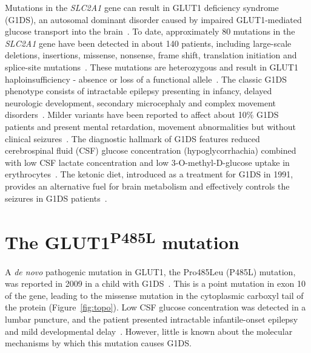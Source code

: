 Mutations in the \textit{SLC2A1} gene can result in GLUT1 deficiency syndrome (G1DS), an autosomal dominant disorder caused by impaired GLUT1-mediated glucose transport into the brain~\cite{De,Klepper}. To date, approximately 80 mutations in the \textit{SLC2A1} gene have been detected in about 140 patients, including large-scale deletions, insertions, missense, nonsense, frame shift, translation initiation and splice-site mutations~\cite{Wang, Leen}. These mutations are heterozygous and result in GLUT1 haploinsufficiency - absence or loss of a functional allele~\cite{Klepper,Leen}. The classic G1DS phenotype consists of intractable epilepsy presenting in infancy, delayed neurologic development, secondary microcephaly and complex movement disorders~\cite{De,Klepper}. Milder variants have been reported to affect about 10\% G1DS patients and present mental retardation, movement abnormalities but without clinical seizures~\cite{Wang,Suls}. The diagnostic hallmark of G1DS features reduced cerebrospinal fluid (CSF) glucose concentration (hypoglycorrhachia) combined with low CSF lactate concentration and low 3-O-methyl-D-glucose uptake in erythrocytes~\cite{Wang,Klepper.2}. The ketonic diet, introduced as a treatment for G1DS in 1991, provides an alternative fuel for brain metabolism and effectively controls the seizures in G1DS patients~\cite{Wang}.

 \section{The GLUT1\textsuperscript{P485L} mutation}

A \textit{de novo} pathogenic mutation in GLUT1, the Pro485Leu (P485L) mutation, was reported in 2009 in a child with G1DS~\cite{Slaughter}. This is a point mutation in exon 10 of the gene, leading to the missense mutation in the cytoplasmic carboxyl tail of the protein (Figure~\ref{fig:topo}). Low CSF glucose concentration was detected in a lumbar puncture, and the patient presented intractable infantile-onset epilepsy and mild developmental delay~\cite{Slaughter}. However, little is known about the molecular mechanisms by which this mutation causes G1DS.

